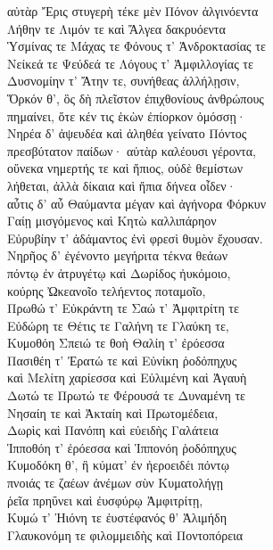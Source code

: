 \begin{pages}
\begin{Leftside}
\quad{}αὐτὰρ Ἔρις στυγερὴ τέκε μὲν Πόνον ἀλγινόεντα\\
Λήθην τε Λιμόν τε καὶ Ἄλγεα δακρυόεντα\\
Ὑσμίνας τε Μάχας τε Φόνους τ' Ἀνδροκτασίας τε\\
Νείκεά τε Ψεύδεά τε Λόγους τ' Ἀμφιλλογίας τε \\
Δυσνομίην τ' Ἄτην τε, συνήθεας ἀλλήλῃσιν, \\
Ὅρκόν θ', ὃς δὴ πλεῖστον ἐπιχθονίους ἀνθρώπους\\
πημαίνει, ὅτε κέν τις ἑκὼν ἐπίορκον ὀμόσσῃ· \\

{\minion\Para}
Νηρέα δ' ἀψευδέα καὶ ἀληθέα γείνατο Πόντος \\
πρεσβύτατον παίδων· αὐτὰρ καλέουσι γέροντα, \\
οὕνεκα νημερτής τε καὶ ἤπιος, οὐδὲ θεμίστων \\
λήθεται, ἀλλὰ δίκαια καὶ ἤπια δήνεα οἶδεν· \\
αὖτις δ' αὖ Θαύμαντα μέγαν καὶ ἀγήνορα Φόρκυν\\
Γαίῃ μισγόμενος καὶ Κητὼ καλλιπάρηον \\
Εὐρυβίην τ' ἀδάμαντος ἐνὶ φρεσὶ θυμὸν ἔχουσαν.\\
Νηρῆος δ' ἐγένοντο μεγήριτα τέκνα θεάων \\
πόντῳ ἐν ἀτρυγέτῳ καὶ Δωρίδος ἠυκόμοιο,\\
κούρης Ὠκεανοῖο τελήεντος ποταμοῖο, \\
Πρωθώ τ' Εὐκράντη τε Σαώ τ' Ἀμφιτρίτη τε \\
Εὐδώρη τε Θέτις τε Γαλήνη τε Γλαύκη τε,\\
Κυμοθόη Σπειώ τε θοὴ Θαλίη τ' ἐρόεσσα \\
Πασιθέη τ' Ἐρατώ τε καὶ Εὐνίκη ῥοδόπηχυς\\
καὶ Μελίτη χαρίεσσα καὶ Εὐλιμένη καὶ Ἀγαυὴ\\
Δωτώ τε Πρωτώ τε Φέρουσά τε Δυναμένη τε\\
Νησαίη τε καὶ Ἀκταίη καὶ Πρωτομέδεια,\\
Δωρὶς καὶ Πανόπη καὶ εὐειδὴς Γαλάτεια  \\
Ἱπποθόη τ' ἐρόεσσα καὶ Ἱππονόη ῥοδόπηχυς\\
Κυμοδόκη θ', ἣ κύματ' ἐν ἠεροειδέι πόντῳ\\
πνοιάς τε ζαέων ἀνέμων σὺν Κυματολήγῃ\\
ῥεῖα πρηΰνει καὶ ἐυσφύρῳ Ἀμφιτρίτῃ,\\
Κυμώ τ' Ἠιόνη τε ἐυστέφανός θ' Ἁλιμήδη \\
Γλαυκονόμη τε φιλομμειδὴς καὶ Ποντοπόρεια\\

\end{Leftside}
\end{pages}
